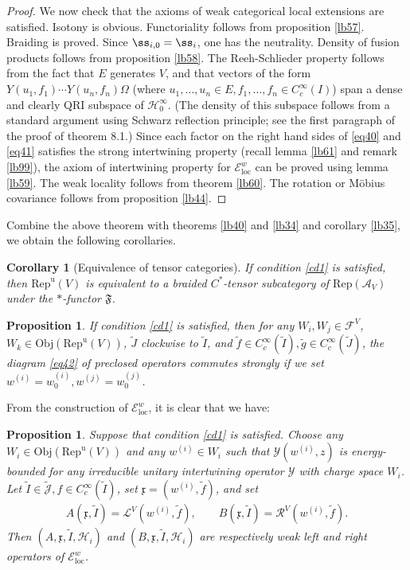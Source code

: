 \documentclass[12pt,a4paper]{article}
\theoremstyle{definition}
\theoremstyle{plain}
\newtheorem{pp}[df]{Proposition}
\newtheorem{co}[df]{Corollary}
\newcommand{\fk}{\mathfrak}
\newcommand{\mc}{\mathcal}
\newcommand{\wtd}{\widetilde}
\newcommand{\Rep}{\mathrm{Rep}}
\newcommand{\loc}{\mathrm{loc}}
\newcommand{\scr}{\mathscr}
\newcommand{\Jtd}{\widetilde{\mathcal J}}
\newcommand{\RepuV}{\mathrm{Rep}^{\mathrm u}(V)}
\newcommand{\Obj}{\mathrm{Obj}}
\numberwithin{equation}{subsection}
\begin{document}
\begin{proof}
We now check that the axioms of  weak categorical local extensions are satisfied. Isotony is obvious. Functoriality follows from proposition \ref{lb57}. Braiding is proved. Since $\ss_{i,0}=\ss_i$, one has the neutrality. Density of fusion products follows from proposition \ref{lb58}. The Reeh-Schlieder property follows from the fact that $E$ generates $V$, and that vectors of the form $Y(u_1,f_1)\cdots Y(u_n,f_n)\Omega$ (where $u_1,\dots,u_n\in E,f_1,\dots,f_n\in C_c^\infty(I)$) span a dense and clearly QRI subspace of $\mc H_0^\infty$. (The density of this subspace follows from a standard argument using Schwarz reflection principle; see the first paragraph of the proof of \cite{CKLW18} theorem 8.1.) Since each factor on the right hand sides of \eqref{eq40} and \eqref{eq41} satisfies the strong intertwining property (recall lemma \ref{lb61} and remark \ref{lb99}), the axiom of intertwining property for $\scr E^w_\loc$ can be proved using lemma \ref{lb59}. The weak locality follows from theorem \ref{lb60}. The rotation or M\"obius covariance follows from proposition \ref{lb44}.
\end{proof}


Combine the above theorem with theorems \ref{lb40} and \ref{lb34} and corollary \ref{lb35}, we obtain the following corollaries.

\begin{co}[Equivalence of tensor categories]\label{lb71}
If condition \ref{cd1} is satisfied, then $\RepuV$ is equivalent to a braided $C^*$-tensor subcategory of $\Rep(\mc A_V)$ under the $*$-functor $\fk F$.
\end{co}

\begin{pp}\label{lb78}
If condition \ref{cd1} is satisfied, then for any $W_i,W_j\in\mc F^V$, $W_k\in\Obj(\RepuV)$, $\wtd J$ clockwise to $\wtd I$, and $\wtd f\in C_c^\infty(\wtd I),\wtd g\in C_c^\infty(\wtd J)$, the diagram \eqref{eq42} of preclosed operators commutes strongly if we set $w^{(i)}=w^{(i)}_0,w^{(j)}=w^{(j)}_0$.
\end{pp}

From the construction of $\scr E^w_\loc$, it is clear that we have:

\begin{pp}\label{lb64}
Suppose that condition \ref{cd1} is satisfied. Choose any $W_i\in\Obj(\RepuV)$ and any $w^{(i)}\in W_i$ such that $\mc Y(w^{(i)},z)$ is energy-bounded for any irreducible unitary intertwining operator $\mc Y$ with charge space $W_i$. Let $\wtd I\in\Jtd,f\in C_c^\infty(\wtd I)$,  set $\fk x=(w^{(i)},\wtd f)$, and set
\begin{align}
A(\fk x,\wtd I)=\mc L^V(w^{(i)},\wtd f),\qquad B(\fk x,\wtd I)=\mc R^V(w^{(i)},\wtd f).
\end{align}
Then $(A,\fk x,\wtd I,\mc H_i)$ and $(B,\fk x,\wtd I,\mc H_i)$ are respectively weak left and right operators of $\scr E^w_\loc$.
\end{pp}
\end{document}
